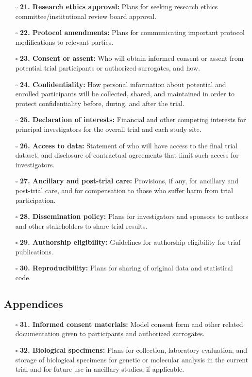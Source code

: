 \documentclass[11pt]{article}
\def\tightlist{}
\begin{document}
\begin{Form}
\begin{itemize}
\tightlist
\item[$\square$]
  \textbf{21. Research ethics approval:} Plans for seeking research
  ethics committee/institutional review board approval.
\item[$\square$]
  \textbf{22. Protocol amendments:} Plans for communicating important
  protocol modifications to relevant parties.
\item[$\square$]
  \textbf{23. Consent or assent:} Who will obtain informed consent or
  assent from potential trial participants or authorized surrogates, and
  how.
\item[$\square$]
  \textbf{24. Confidentiality:} How personal information about potential
  and enrolled participants will be collected, shared, and maintained in
  order to protect confidentiality before, during, and after the trial.
\item[$\square$]
  \textbf{25. Declaration of interests:} Financial and other competing
  interests for principal investigators for the overall trial and each
  study site.
\item[$\square$]
  \textbf{26. Access to data:} Statement of who will have access to the
  final trial dataset, and disclosure of contractual agreements that
  limit such access for investigators.
\item[$\square$]
  \textbf{27. Ancillary and post-trial care:} Provisions, if any, for
  ancillary and post-trial care, and for compensation to those who
  suffer harm from trial participation.
\item[$\square$]
  \textbf{28. Dissemination policy:} Plans for investigators and
  sponsors to authors and other stakeholders to share trial results.
\item[$\square$]
  \textbf{29. Authorship eligibility:} Guidelines for authorship
  eligibility for trial publications.
\item[$\square$]
  \textbf{30. Reproducibility:} Plans for sharing of original data and
  statistical code.
\end{itemize}

\subsection{Appendices}\label{appendices}

\begin{itemize}
\tightlist
\item[$\square$]
  \textbf{31. Informed consent materials:} Model consent form and other
  related documentation given to participants and authorized surrogates.
\item[$\square$]
  \textbf{32. Biological specimens:} Plans for collection, laboratory
  evaluation, and storage of biological specimens for genetic or
  molecular analysis in the current trial and for future use in
  ancillary studies, if applicable.
\end{itemize}


\end{Form}
\end{document}
